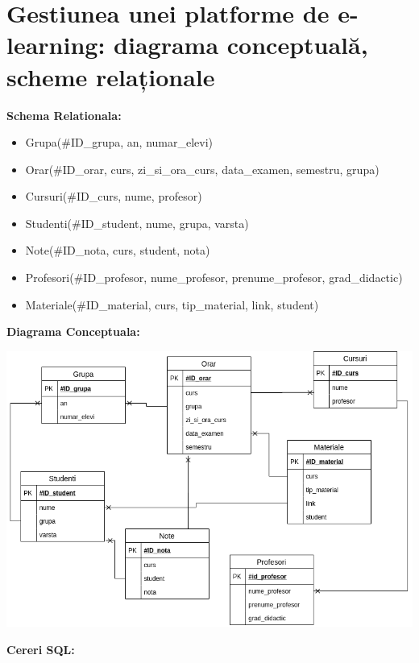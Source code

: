 \documentclass[a4paper,12pt]{article}
\begin{document}
	\section{Gestiunea unei platforme de e-learning: diagrama conceptuală, scheme relaționale}
		
		\textbf{Schema Relationala:}
		
		\begin{itemize}
			\item Grupa(\#ID\_grupa, an, numar\_elevi)
			\item Orar(\#ID\_orar, curs, zi\_si\_ora\_curs, data\_examen, semestru, grupa)
			\item Cursuri(\#ID\_curs, nume, profesor)
			\item Studenti(\#ID\_student, nume, grupa, varsta)
			\item Note(\#ID\_nota, curs, student, nota)
			\item Profesori(\#ID\_profesor, nume\_profesor, prenume\_profesor, grad\_didactic)
			\item Materiale(\#ID\_material, curs, tip\_material, link, student)
		\end{itemize}
	
		\textbf{Diagrama Conceptuala:}
		
		\includegraphics[scale=0.6]{BDTemaCurs8DiagramaConceptuala.png}
		\newpage
		
		
		\textbf{Cereri SQL:}
		
\end{document}
